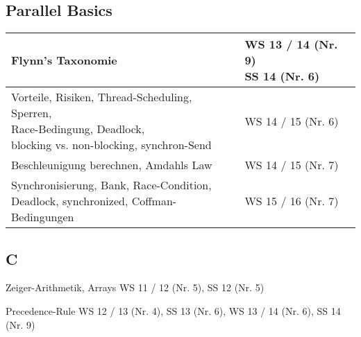 \subsection*{Parallel Basics}
\begin{table}[h]
	\centering
	\label{my-label}
	\begin{tabular}{l|l}		
		Flynn’s Taxonomie 
		& \multlineTable{WS 13 / 14 (Nr. 9)\\ SS 14 (Nr. 6)}\\ \hline		
		
		\multlineTable{Vorteile, Risiken, Thread-Scheduling, Sperren,\\ Race-Bedingung, Deadlock,\\ blocking vs. non-blocking, synchron-Send}
		& WS 14 / 15 (Nr. 6) \\ \hline			
		
		Beschleunigung berechnen, Amdahls Law
		& WS 14 / 15 (Nr. 7) \\ \hline		
				
		\multlineTable{Synchronisierung, Bank, Race-Condition,\\ Deadlock, synchronized, Coffman-Bedingungen}
		& WS 15 / 16 (Nr. 7) \\ \hline
	\end{tabular}
\end{table}
\FloatBarrier
\newpage

\subsection*{C}
\begin{compactitem}
	\item Zeiger-Arithmetik, Arrays \qquad WS 11 / 12 (Nr. 5),  SS 12 (Nr. 5)
	\item Precedence-Rule \qquad \qquad \qquad WS 12 / 13 (Nr. 4), SS 13 (Nr. 6), WS 13 / 14 (Nr. 6), SS 14 (Nr. 9)
\end{compactitem}

